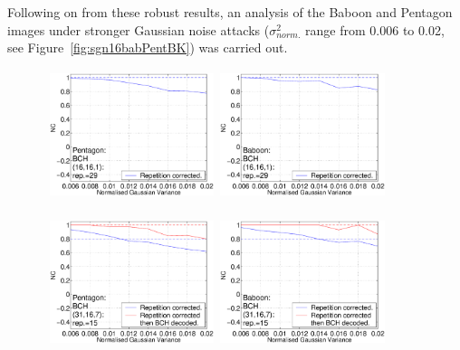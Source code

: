 \documentclass[12pt]{report}
\begin{document}
Following on from these robust results, an analysis of the Baboon and Pentagon images 
under stronger Gaussian noise attacks ($\sigma_{norm.}^{2}$ range from 0.006 to 0.02, see Figure~\ref{fig:sgn16babPentBK}) was carried out.
\begin{figure}[p]
\setlength{\abovecaptionskip}{-0.25cm}
\centerline{ \hbox{
\includegraphics[height=3.81cm,width=4.8cm]{EPS_BK_formattedBetter/SGpent16.eps}
\includegraphics[height=3.81cm,width=4.8cm]{EPS_BK_formattedBetter/SGbab16.eps} \\
}}
 
\centerline{ \hbox{
\includegraphics[height=3.81cm,width=4.8cm]{EPS_BK_formattedBetter/SGpent31.eps}
\includegraphics[height=3.81cm,width=4.8cm]{EPS_BK_formattedBetter/SGbab31.eps} \\
}}
 

\end{figure}
\end{document}
